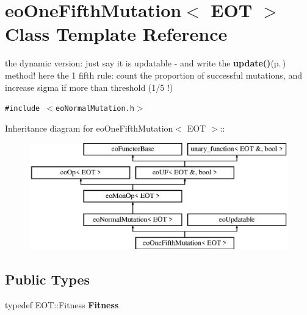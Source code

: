 \section{eo\-One\-Fifth\-Mutation$<$ EOT $>$ Class Template Reference}
\label{classeo_one_fifth_mutation}
the dynamic version: just say it is updatable - and write the {\bf update()}{\rm (p.\,\pageref{classeo_one_fifth_mutation_a3})} method! here the 1 fifth rule: count the proportion of successful mutations, and increase sigma if more than threshold (1/5 !)  


{\tt \#include $<$eo\-Normal\-Mutation.h$>$}

Inheritance diagram for eo\-One\-Fifth\-Mutation$<$ EOT $>$::\begin{figure}[H]
\begin{center}
\leavevmode
\includegraphics[height=4.64345cm]{classeo_one_fifth_mutation}
\end{center}
\end{figure}
\subsection*{Public Types}
\begin{CompactItemize}
\item 
typedef EOT::Fitness {\bf Fitness}\label{classeo_one_fifth_mutation_w0}

\end{CompactItemize}
